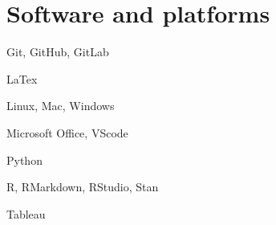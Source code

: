 \documentclass[letterpaper]{resume_config}
\begin{document}
\section{Software and platforms}
\begin{SkillsList}
	\item Git, GitHub, GitLab 
	\item LaTex
    \item Linux, Mac, Windows
    \item Microsoft Office, VScode
	\item Python
    \item R, RMarkdown, RStudio, Stan 
    \item Tableau 
\end{SkillsList}
%
%
%
\end{document}
